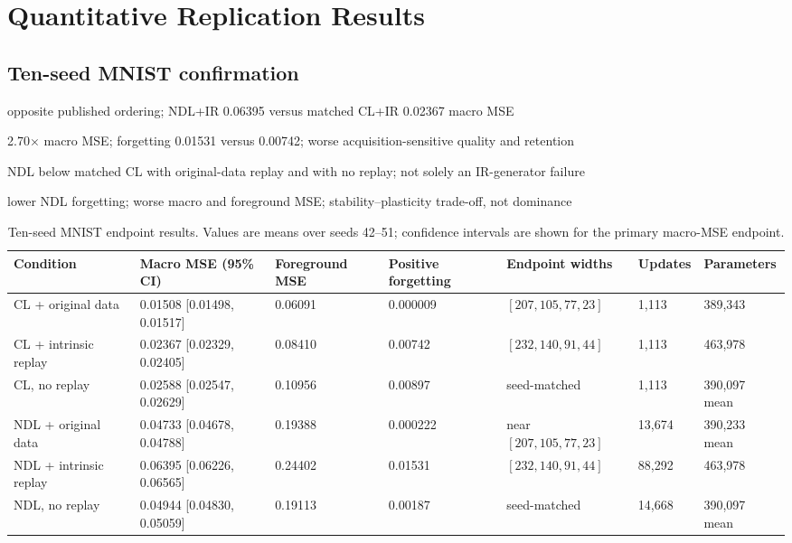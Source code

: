 \section{Quantitative Replication Results}

\subsection{Ten-seed MNIST confirmation}
\begin{draftpoints}
  \item {}opposite published ordering; NDL+IR 0.06395 versus matched CL+IR 0.02367 macro MSE
  \item {}2.70$\times$ macro MSE; forgetting 0.01531 versus 0.00742; worse acquisition-sensitive quality and retention
  \item {}NDL below matched CL with original-data replay and with no replay; not solely an IR-generator failure
  \item {}lower NDL forgetting; worse macro and foreground MSE; stability--plasticity trade-off, not dominance
\end{draftpoints}

\begin{table}[htbp]
\centering
\caption{Ten-seed MNIST endpoint results. Values are means over seeds 42--51; confidence intervals are shown for the primary macro-MSE endpoint.}
\label{tab:mnist-main-results}
\scriptsize
\begin{tabularx}{\textwidth}{Yp{2.4cm}p{1.7cm}p{1.8cm}p{2.2cm}p{1.5cm}p{1.8cm}}
\toprule
Condition & Macro MSE (95\% CI) & Foreground MSE & Positive forgetting & Endpoint widths & Updates & Parameters \\
\midrule
CL + original data & 0.01508 [0.01498, 0.01517] & 0.06091 & 0.000009 & $[207,105,77,23]$ & 1,113 & 389,343 \\
CL + intrinsic replay & 0.02367 [0.02329, 0.02405] & 0.08410 & 0.00742 & $[232,140,91,44]$ & 1,113 & 463,978 \\
CL, no replay & 0.02588 [0.02547, 0.02629] & 0.10956 & 0.00897 & seed-matched & 1,113 & 390,097 mean \\
NDL + original data & 0.04733 [0.04678, 0.04788] & 0.19388 & 0.000222 & near $[207,105,77,23]$ & 13,674 & 390,233 mean \\
NDL + intrinsic replay & 0.06395 [0.06226, 0.06565] & 0.24402 & 0.01531 & $[232,140,91,44]$ & 88,292 & 463,978 \\
NDL, no replay & 0.04944 [0.04830, 0.05059] & 0.19113 & 0.00187 & seed-matched & 14,668 & 390,097 mean \\
\bottomrule
\end{tabularx}
\end{table}


